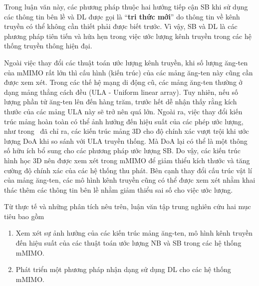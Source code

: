 Trong luận văn này, các phương pháp thuộc hai hướng tiếp cận SB khi sử dụng các thông tin bên lề và DL được gọi là ``\textbf{tri thức mới}'' do thông tin về kênh truyền có thể không cần thiết phải được biết trước. 
Vì vậy, SB và DL là các phương pháp tiên tiến và hứa hẹn trong việc ước lượng kênh truyền trong các hệ thống truyền thông hiện đại.

Ngoài việc thay đổi các thuật toán ước lượng kênh truyền, khi số lượng ăng-ten của mMIMO rất lớn thì cấu hình (kiến trúc) của các mảng ăng-ten này cũng cần được xem xét. Trong các thế hệ mạng di động cũ, các mảng ăng-ten thường ở dạng mảng thẳng cách đều (ULA - Uniform linear array). Tuy nhiên, nếu số lượng phần tử ăng-ten lên đến hàng trăm, trước hết dễ nhận thấy rằng kích thước của các mảng ULA này sẽ trở nên quá lớn. Ngoài ra, việc thay đổi kiến trúc mảng hoàn toàn có thể ảnh hưởng đến hiệu suất của các phép ước lượng, như trong~\cite{POORMOHAMMAD2017} đã chỉ ra, các kiến trúc mảng 3D cho độ chính xác vượt trội khi ước lượng DoA khi so sánh với ULA truyền thống. Mà DoA lại có thể là một thông số hữu ích bổ sung cho các phương pháp ước lượng SB. Do vậy, các kiến trúc hình học 3D nên được xem xét trong mMIMO để giảm thiểu kích thước và tăng cường độ chính xác của các hệ thống thu phát. Bên cạnh thay đổi cấu trúc vật lí của mảng ăng-ten, các mô hình kênh truyền cũng có thể được xem xét nhằm khai thác thêm các thông tin bên lề nhằm giảm thiểu sai số cho việc ước lượng.

Từ thực tế và những phân tích nêu trên, luận văn tập trung nghiên cứu hai mục tiêu bao gồm
\begin{enumerate}
    \item Xem xét sự ảnh hưởng của các kiến trúc mảng ăng-ten, mô hình kênh truyền đến hiệu suất của các thuật toán ước lượng NB và SB trong các hệ thống mMIMO.
    
    \item Phát triển một phương pháp nhận dạng sử dụng DL cho các hệ thống mMIMO.
\end{enumerate}
\vspace{0.5cm}


